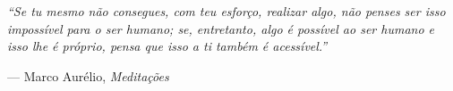 \thispagestyle{empty}
\vspace*{\fill}

\begin{flushright}
\begin{minipage}{0.6\textwidth}
\textit{
``Se tu mesmo não consegues, com teu esforço, realizar algo, não penses ser isso impossível para o ser humano; se, entretanto, algo é possível ao ser humano e isso lhe é próprio, pensa que isso a ti também é acessível.''
}

\vspace{0.5cm}

\hfill --- Marco Aurélio, \textit{Meditações}
\end{minipage}
\end{flushright}

\vspace*{\fill}
\newpage

